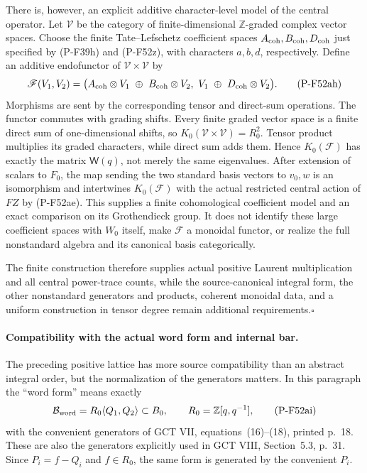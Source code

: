 There is, however, an explicit additive character-level model
of the central operator. Let $\mathscr V$ be the category of
finite-dimensional $\mathbb Z$-graded complex vector spaces.
Choose the finite Tate--Lefschetz coefficient spaces
$A_{\rm coh},B_{\rm coh},D_{\rm coh}$ just specified by
(P-F39h) and (P-F52z), with characters $a,b,d$, respectively.
Define an additive endofunctor of $\mathscr V\times\mathscr V$ by
\[
 \mathscr F(V_1,V_2)=
 \bigl(A_{\rm coh}\otimes V_1\ \oplus\ B_{\rm coh}\otimes V_2,
                    \ V_1\ \oplus\ D_{\rm coh}\otimes V_2\bigr).
                                                               \tag{P-F52ah}
\]
Morphisms are sent by the corresponding tensor and direct-sum
operations. The functor commutes with grading shifts.
Every finite graded vector space is a finite direct sum of
one-dimensional shifts, so
$K_0(\mathscr V\times\mathscr V)=R_0^2$.
Tensor product multiplies its graded characters, while
direct sum adds them. Hence $K_0(\mathscr F)$ has exactly
the matrix $\mathsf W(q)$, not merely the same eigenvalues.
After extension of scalars to $F_0$, the map sending the
two standard basis vectors to $v_0,w$ is an isomorphism
and intertwines $K_0(\mathscr F)$ with the actual restricted
central action of $FZ$ by (P-F52ae).
This supplies a finite cohomological coefficient model and an
exact comparison on its Grothendieck group. It does not
identify these large coefficient spaces with $W_0$ itself,
make $\mathscr F$ a monoidal functor, or realize the full
nonstandard algebra and its canonical basis categorically.

The finite construction therefore supplies actual positive
Laurent multiplication and all central power-trace counts,
while the source-canonical integral form, the other
nonstandard generators and products, coherent monoidal
data, and a uniform construction in tensor degree remain
additional requirements.\hfill$\square$

\paragraph{Compatibility with the actual word form and internal bar.}
The preceding positive lattice has more source compatibility than
an abstract integral order, but the normalization of the generators
matters. In this paragraph the ``word form'' means exactly
\[
       \mathcal B_{\rm word}
           =R_0\langle Q_1,Q_2\rangle\subset B_0,
           \qquad R_0=\mathbb Z[q,q^{-1}],
                                                               \tag{P-F52ai}
\]
with the convenient generators of GCT VII, equations~(16)--(18),
printed p.~18. These are also the generators explicitly used in
GCT VIII, Section~5.3, p.~31. Since $P_i=f-Q_i$ and $f\in R_0$,
the same form is generated by the convenient $P_i$.

